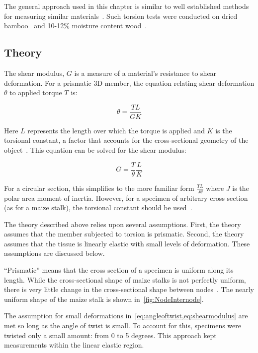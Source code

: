 The general approach used in this chapter is similar to well established methods for measuring similar materials~. Such torsion tests were conducted on dried bamboo~ and 10-12\% moisture content wood~.

\subsection{Theory}
\label{ssec:ch3_theory}
The shear modulus, ${G}$ is a measure of a material’s resistance to shear deformation. For a prismatic 3D member, the equation relating shear deformation ${\theta}$ to applied torque ${T}$  is:

\begin{equation}
	\label{eq:angleoftwist}
	\theta = \frac{TL}{GK}
\end{equation}

Here ${L}$ represents the length over which the torque is applied and ${K}$ is the torsional constant, a factor that accounts for the cross-sectional geometry of the object~. This equation can be solved for the shear modulus:

\begin{equation}
	\label{eq:shearmodulus}
	G = \frac{T}{\theta} \frac{L}{K}
\end{equation}

For a circular section, this simplifies to the more familiar form ${\frac{TL}{J\theta}}$ where ${J}$ is the polar area moment of inertia. However, for a specimen of arbitrary cross section (as for a maize stalk), the torsional constant should be used~.

The theory described above relies upon several assumptions. First, the theory assumes that the member subjected to torsion is prismatic. Second, the theory assumes that the tissue is linearly elastic with small levels of deformation. These assumptions are discussed below.

“Prismatic” means that the cross section of a specimen is uniform along its length. While the cross-sectional shape of maize stalks is not perfectly uniform, there is very little change in the cross-sectional shape between nodes~.  The nearly uniform shape of the maize stalk is shown in~\cref{fig:NodeInternode}.

The assumption for small deformations in~\cref{eq:angleoftwist,eq:shearmodulus} are met so long as the angle of twist is small. To account for this, specimens were twisted only a small amount: from 0 to 5 degrees. This approach kept measurements within the linear elastic region.

